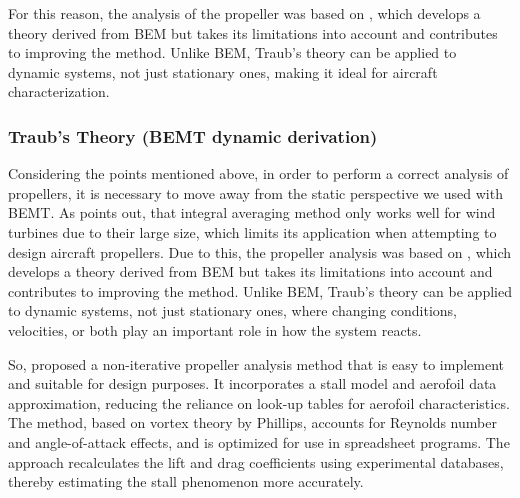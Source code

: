 \documentclass{Format}
\begin{document}
For this reason, the analysis of the propeller was based on \cite{traub2016}, which develops a theory derived from BEM but takes its limitations into account and contributes to improving the method. Unlike BEM, Traub's theory can be applied to dynamic systems, not just stationary ones, making it ideal for aircraft characterization.

\subsubsection{Traub's Theory (BEMT dynamic derivation)}

Considering the points mentioned above, in order to perform a correct analysis of propellers, it is necessary to move away from the static perspective we used with BEMT. As \cite{ning2021} points out, that integral averaging method only works well for wind turbines due to their large size, which limits its application when attempting to design aircraft propellers. Due to this, the propeller analysis was based on \cite{traub2016}, which develops a theory derived from BEM but takes its limitations into account and contributes to improving the method. Unlike BEM, Traub’s theory can be applied to dynamic systems, not just stationary ones, where changing conditions, velocities, or both play an important role in how the system reacts. 

So, \cite{traub2016} proposed a non-iterative propeller analysis method that is easy to implement and suitable for design purposes. It incorporates a stall model and aerofoil data approximation, reducing the reliance on look-up tables for aerofoil characteristics. The method, based on vortex theory by Phillips, accounts for Reynolds number and angle-of-attack effects, and is optimized for use in spreadsheet programs. The approach recalculates the lift and drag coefficients using experimental databases, thereby estimating the stall phenomenon more accurately.
\end{document}
